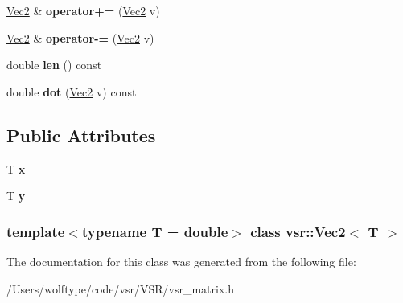 \begin{DoxyCompactItemize}
\item 
\hypertarget{classvsr_1_1_vec2_a9710d2492792bfe141cbc669858ebb1d}{\hyperlink{classvsr_1_1_vec2}{Vec2} \& {\bfseries operator+=} (\hyperlink{classvsr_1_1_vec2}{Vec2} v)}\label{classvsr_1_1_vec2_a9710d2492792bfe141cbc669858ebb1d}

\item 
\hypertarget{classvsr_1_1_vec2_a2fdc35b12b5cfeb8c4c8d92418bc7f37}{\hyperlink{classvsr_1_1_vec2}{Vec2} \& {\bfseries operator-\/=} (\hyperlink{classvsr_1_1_vec2}{Vec2} v)}\label{classvsr_1_1_vec2_a2fdc35b12b5cfeb8c4c8d92418bc7f37}

\item 
\hypertarget{classvsr_1_1_vec2_aaea53d6c4db2cbd0869008c7be43f21b}{double {\bfseries len} () const }\label{classvsr_1_1_vec2_aaea53d6c4db2cbd0869008c7be43f21b}

\item 
\hypertarget{classvsr_1_1_vec2_a1124420d914095bf82e024ea41613b3e}{double {\bfseries dot} (\hyperlink{classvsr_1_1_vec2}{Vec2} v) const }\label{classvsr_1_1_vec2_a1124420d914095bf82e024ea41613b3e}

\end{DoxyCompactItemize}
\subsection*{Public Attributes}
\begin{DoxyCompactItemize}
\item 
\hypertarget{classvsr_1_1_vec2_a80d8f3d03b0d64604ef07e856cc55ca5}{T {\bfseries x}}\label{classvsr_1_1_vec2_a80d8f3d03b0d64604ef07e856cc55ca5}

\item 
\hypertarget{classvsr_1_1_vec2_acc629e22d6ab15047c60e10757f1f787}{T {\bfseries y}}\label{classvsr_1_1_vec2_acc629e22d6ab15047c60e10757f1f787}

\end{DoxyCompactItemize}
\subsubsection*{template$<$typename T = double$>$ class vsr\-::\-Vec2$<$ T $>$}



The documentation for this class was generated from the following file\-:\begin{DoxyCompactItemize}
\item 
/\-Users/wolftype/code/vsr/\-V\-S\-R/vsr\-\_\-matrix.\-h\end{DoxyCompactItemize}
